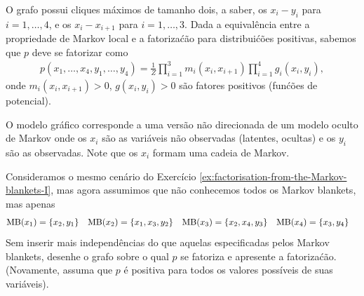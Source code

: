 \begin{solution}
    O grafo possui cliques m\'aximos de tamanho dois, a saber, os $x_i-y_i$ para
    $i=1,\ldots, 4$, e os $x_i-x_{i+1}$ para $i=1, \ldots, 3$. Dada
    a equival\^encia entre a propriedade de Markov local e a fatoriza\'c\~ao
    para distribui\'c\~oes positivas, sabemos que $p$ deve se fatorizar como
    \begin{align}
        p(x_1, \ldots, x_4, y_1, \ldots, y_4) = \frac{1}{Z} \prod_{i=1}^3 m_i(x_i,x_{i+1}) \prod_{i=1}^4 g_i(x_i,y_i),
    \end{align}
    onde $m_i(x_i, x_{i+1})>0$, $g(x_i,y_i)>0$ s\~ao fatores positivos (fun\'c\~oes de potencial).
    
    O modelo gr\'afico corresponde a uma vers\~ao n\~ao direcionada de um modelo oculto
    de Markov onde os $x_i$ s\~ao as vari\'aveis n\~ao observadas (latentes, ocultas)
    e os $y_i$ s\~ao as observadas. Note que os $x_i$
    formam uma cadeia de Markov.
    
\end{solution}

\label{ex:factorisation-from-the-Markov-blankets-II}

Consideramos o mesmo cenário do Exerc\'icio \ref{ex:factorisation-from-the-Markov-blankets-I}, mas agora assumimos que n\~ao conhecemos todos os Markov blankets, mas apenas
\begin{align}
    \textrm{MB}(x_1) &= \{x_2, y_1\} & \textrm{MB}(x_2)&=\{x_1, x_3, y_2\} & \textrm{MB}(x_3)&=\{x_2, x_4, y_3\} & \textrm{MB}(x_4)&=\{x_3, y_4\}
\end{align}
Sem inserir mais independ\^encias do que aquelas especificadas pelos
Markov blankets, desenhe o grafo sobre o qual $p$ se fatoriza e apresente
a fatoriza\'c\~ao. (Novamente, assuma que $p$ \'e positiva para todos os valores
poss\'iveis de suas vari\'aveis).

